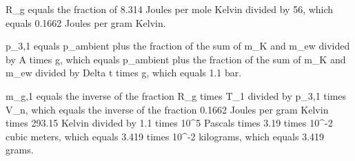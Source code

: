 R_g equals the fraction of 8.314 Joules per mole Kelvin divided by 56, which equals 0.1662 Joules per gram Kelvin.

p_{3,1} equals p_{ambient} plus the fraction of the sum of m_K and m_ew divided by A times g, which equals p_{ambient} plus the fraction of the sum of m_K and m_ew divided by Delta t times g, which equals 1.1 bar.

m_{g,1} equals the inverse of the fraction R_g times T_1 divided by p_{3,1} times V_n, which equals the inverse of the fraction 0.1662 Joules per gram Kelvin times 293.15 Kelvin divided by 1.1 times 10^5 Pascals times 3.19 times 10^-2 cubic meters, which equals 3.419 times 10^-2 kilograms, which equals 3.419 grams.